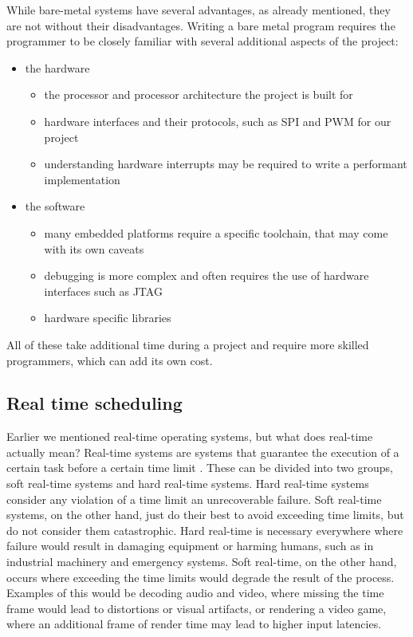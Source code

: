 While bare-metal systems have several advantages, as already mentioned, they are not without their disadvantages.
Writing a bare metal program requires the programmer to be closely familiar with several additional aspects of the project:
\begin{itemize}
    \item the hardware
    \begin{itemize}
        \item the processor and processor architecture the project is built for
        \item hardware interfaces and their protocols, such as SPI and PWM for our project
        \item understanding hardware interrupts may be required to write a performant implementation
    \end{itemize}
    \item the software
    \begin{itemize}
        \item many embedded platforms require a specific toolchain, that may come with its own caveats
        \item debugging is more complex and often requires the use of hardware interfaces such as JTAG
        \item hardware specific libraries
    \end{itemize}
\end{itemize}
All of these take additional time during a project and require more skilled programmers, which can add its own cost.

\subsection{Real time scheduling}
\label{sec:background:bm_vs_os:rtos}

Earlier we mentioned real-time operating systems, but what does real-time actually mean?
Real-time systems are systems that guarantee the execution of a certain task before a certain time limit \cite[p. 208]{MarwedelPeter2021SS}.
These can be divided into two groups, soft real-time systems and hard real-time systems.
Hard real-time systems consider any violation of a time limit an unrecoverable failure.
Soft real-time systems, on the other hand, just do their best to avoid exceeding time limits, but do not consider them catastrophic.
Hard real-time is necessary everywhere where failure would result in damaging equipment or harming humans, such as in industrial machinery and emergency systems.
Soft real-time, on the other hand, occurs where exceeding the time limits would degrade the result of the process.
Examples of this would be decoding audio and video, where missing the time frame would lead to distortions or visual artifacts,
or rendering a video game, where an additional frame of render time may lead to higher input latencies.

